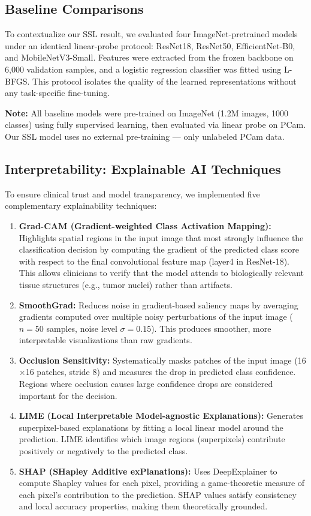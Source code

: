 \documentclass[conference]{IEEEtran}
\begin{document}
\subsection{Baseline Comparisons}
To contextualize our SSL result, we evaluated four ImageNet-pretrained models under an identical linear-probe protocol: ResNet18, ResNet50, EfficientNet-B0, and MobileNetV3-Small. Features were extracted from the frozen backbone on 6,000 validation samples, and a logistic regression classifier was fitted using L-BFGS. This protocol isolates the quality of the learned representations without any task-specific fine-tuning.

\textbf{Note:} All baseline models were pre-trained on ImageNet (1.2M images, 1000 classes) using fully supervised learning, then evaluated via linear probe on PCam. Our SSL model uses no external pre-training — only unlabeled PCam data.

\subsection{Interpretability: Explainable AI Techniques}
To ensure clinical trust and model transparency, we implemented five complementary explainability techniques:

\begin{enumerate}
\item \textbf{Grad-CAM (Gradient-weighted Class Activation Mapping):} Highlights spatial regions in the input image that most strongly influence the classification decision by computing the gradient of the predicted class score with respect to the final convolutional feature map (layer4 in ResNet-18). This allows clinicians to verify that the model attends to biologically relevant tissue structures (e.g., tumor nuclei) rather than artifacts.

\item \textbf{SmoothGrad:} Reduces noise in gradient-based saliency maps by averaging gradients computed over multiple noisy perturbations of the input image ($n=50$ samples, noise level $\sigma=0.15$). This produces smoother, more interpretable visualizations than raw gradients.

\item \textbf{Occlusion Sensitivity:} Systematically masks patches of the input image (16$\times$16 patches, stride 8) and measures the drop in predicted class confidence. Regions where occlusion causes large confidence drops are considered important for the decision.

\item \textbf{LIME (Local Interpretable Model-agnostic Explanations):} Generates superpixel-based explanations by fitting a local linear model around the prediction. LIME identifies which image regions (superpixels) contribute positively or negatively to the predicted class.

\item \textbf{SHAP (SHapley Additive exPlanations):} Uses DeepExplainer to compute Shapley values for each pixel, providing a game-theoretic measure of each pixel's contribution to the prediction. SHAP values satisfy consistency and local accuracy properties, making them theoretically grounded.
\end{enumerate}
\end{document}
